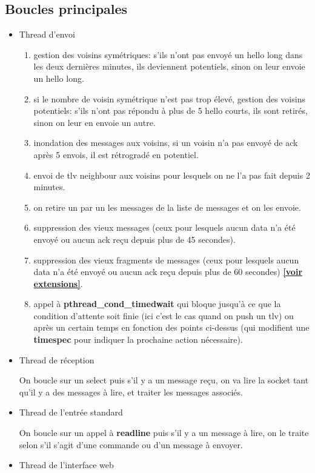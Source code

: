 \documentclass[a4paper,10pt]{article} %
\begin{document}
\subsection{Boucles principales}
\begin{itemize}
    \item Thread d'envoi
\begin{enumerate}
\item gestion des voisins symétriques: s'ils n'ont pas envoyé un hello long dans les deux dernières minutes, ils deviennent potentiels, sinon on leur envoie un hello long.
\item si le nombre de voisin symétrique n'est pas trop élevé, gestion des voisins potentiels: s'ils n'ont pas répondu à plus de 5 hello courts, ils sont retirés, sinon on leur en envoie un autre.
\item inondation des messages aux voisins, si un voisin n'a pas envoyé de ack après 5 envois, il est rétrogradé en potentiel.
\item envoi de tlv neighbour aux voisins pour lesquels on ne l'a pas fait depuis 2 minutes.
\item on retire un par un les messages de la liste de messages et on les envoie.
\item suppression des vieux messages (ceux pour lesquels aucun data n'a été envoyé ou aucun ack reçu depuis plus de 45 secondes).
\item suppression des vieux fragments de messages (ceux pour lesquels aucun data n'a été envoyé ou aucun ack reçu depuis plus de 60 secondes) \hyperref[sec:frag]{\textbf{[voir extensions]}}.
\item appel à \textbf{pthread\_cond\_timedwait} qui bloque jusqu'à ce que la condition d'attente soit finie (ici c'est le cas quand on push un tlv) ou après un certain temps en fonction des points ci-dessus (qui modifient une \textbf{timespec} pour indiquer la prochaine action nécessaire).
\end{enumerate}
    \item Thread de réception

On boucle sur un select puis s'il y a un message reçu, on va lire la socket tant qu'il y a des messages à lire, et traiter les messages associés.
    \item Thread de l'entrée standard

On boucle sur un appel à \textbf{readline} puis s'il y a un message à lire, on le traite selon s'il s'agit d'une commande ou d'un message à envoyer.
    \item Thread de l'interface web
\end{itemize}
\end{document}
